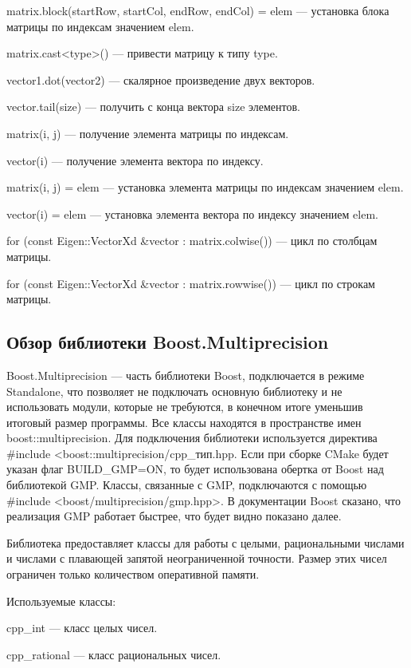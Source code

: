 matrix.block(startRow, startCol, endRow, endCol) = elem --- установка блока матрицы по индексам значением elem.

matrix.cast<type>() --- привести матрицу к типу type.

vector1.dot(vector2) --- скалярное произведение двух векторов.

vector.tail(size) --- получить с конца вектора size элементов.

matrix(i, j) --- получение элемента матрицы по индексам.

vector(i) --- получение элемента вектора по индексу.

matrix(i, j) = elem --- установка элемента матрицы по индексам значением elem.

vector(i) = elem --- установка элемента вектора по индексу значением elem.

for (const Eigen::VectorXd \&vector : matrix.colwise()) --- цикл по столбцам матрицы.

for (const Eigen::VectorXd \&vector : matrix.rowwise()) --- цикл по строкам матрицы.

\subsection{Обзор библиотеки Boost.Multiprecision}

Boost.Multiprecision --- часть библиотеки Boost, подключается в режиме Standalone, что позволяет не подключать основную библиотеку и не использовать модули, которые не требуются, в конечном итоге уменьшив итоговый размер программы. Все классы находятся в пространстве имен boost::multiprecision. Для подключения библиотеки используется директива \#include <boost::mul\-ti\-pre\-ci\-si\-on/cpp\_тип.hpp. Если при сборке CMake будет указан флаг BUILD\_GMP=ON, то будет использована обертка от Boost над библиотекой GMP. Классы, связанные с GMP, подключаются с помощью \#include <boost/mul\-ti\-pre\-ci\-si\-on/gmp.hpp>. В документации Boost сказано, что реализация GMP работает быстрее, что будет видно показано далее.

Библиотека предоставляет классы для работы с целыми, рациональными числами и числами с плавающей запятой неограниченной точности. Размер этих чисел ограничен только количеством оперативной памяти\cite{BoostDoc}. 

Используемые классы:

cpp\_int --- класс целых чисел.

cpp\_rational --- класс рациональных чисел.

